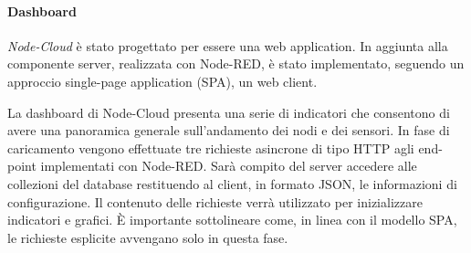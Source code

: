 \documentclass{article}
\begin{document}
\paragraph{Dashboard}
\emph{Node-Cloud} è stato progettato per essere una web application. In aggiunta alla componente server, realizzata con Node-RED, è stato implementato, seguendo un approccio single-page application (SPA), un web client.

La dashboard di Node-Cloud presenta una serie di indicatori che consentono di avere una panoramica generale sull’andamento dei nodi e dei sensori. In fase di caricamento vengono effettuate tre richieste asincrone di tipo HTTP agli end-point implementati con Node-RED. Sarà compito del server accedere alle collezioni del database restituendo al client, in formato JSON, le informazioni di configurazione. Il contenuto delle richieste verrà utilizzato per inizializzare indicatori e grafici. È importante sottolineare come, in linea con il modello SPA, le richieste esplicite avvengano solo in questa fase.
\end{document}
